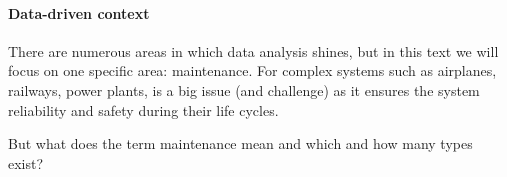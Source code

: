 \paragraph{Data-driven context}
There are numerous areas in which data analysis shines, but in this text we will focus on one specific area: maintenance.
For complex systems such as airplanes, railways, power plants, is a big issue (and challenge) as it ensures the system reliability and safety during their life cycles.

But what does the term maintenance mean and which and how many types exist?